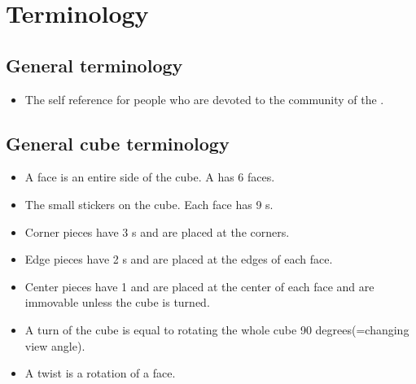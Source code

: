 \chapter{Terminology}


\section{General terminology}
\begin{itemize}
\item {}The self reference for people who are devoted to the community of the \rubik{}. 
\end{itemize}

\section{General cube terminology}
\begin{itemize}
\label{general_notation}
\item {}A face is an entire side of the cube. A \rubik{} has 6 faces.
\item {}The small stickers on the cube. Each face has 9 \facet{}s.
\item {}Corner pieces have 3 \facet{}s and are placed at the corners. 
\item {}Edge pieces have 2 \facet{}s and are placed at the edges of each face. 
\item {}Center pieces have 1 \facet{} and are placed at the center of each face and are immovable unless the cube is turned. 
\item {}A turn of the cube is equal to rotating the whole cube 90 degrees(=changing view angle).
\item {}A twist is a rotation of a face.%
\end{itemize}

